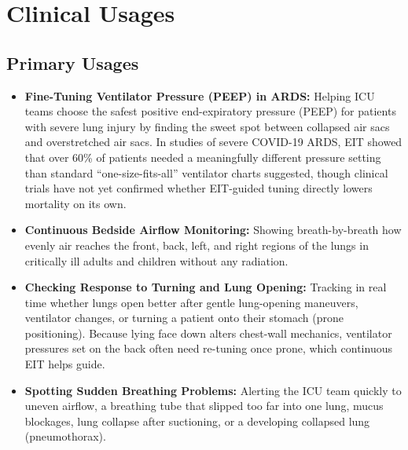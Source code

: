 \section{Clinical Usages}

\subsection{Primary Usages}
\begin{itemize}
    \item \textbf{Fine-Tuning Ventilator Pressure (PEEP) in ARDS:} Helping ICU teams choose the safest positive end-expiratory pressure (PEEP) for patients with severe lung injury by finding the sweet spot between collapsed air sacs and overstretched air sacs. In studies of severe COVID-19 ARDS, EIT showed that over 60\% of patients needed a meaningfully different pressure setting than standard ``one-size-fits-all'' ventilator charts suggested, though clinical trials have not yet confirmed whether EIT-guided tuning directly lowers mortality on its own.
    \item \textbf{Continuous Bedside Airflow Monitoring:} Showing breath-by-breath how evenly air reaches the front, back, left, and right regions of the lungs in critically ill adults and children without any radiation.
    \item \textbf{Checking Response to Turning and Lung Opening:} Tracking in real time whether lungs open better after gentle lung-opening maneuvers, ventilator changes, or turning a patient onto their stomach (prone positioning). Because lying face down alters chest-wall mechanics, ventilator pressures set on the back often need re-tuning once prone, which continuous EIT helps guide.
    \item \textbf{Spotting Sudden Breathing Problems:} Alerting the ICU team quickly to uneven airflow, a breathing tube that slipped too far into one lung, mucus blockages, lung collapse after suctioning, or a developing collapsed lung (pneumothorax).
\end{itemize}

